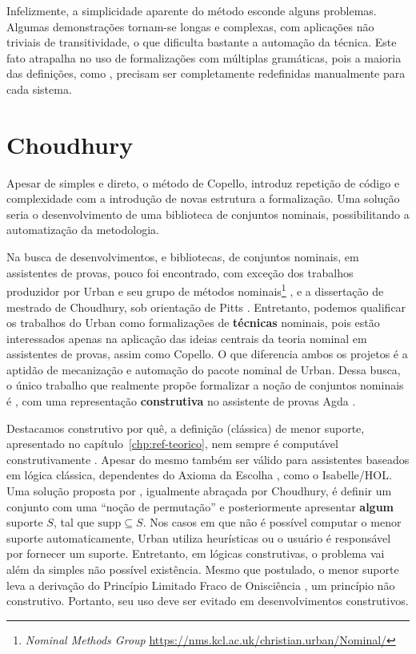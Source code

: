 Infelizmente, a simplicidade aparente do método esconde alguns problemas. Algumas demonstrações tornam-se longas e complexas, com aplicações não triviais de transitividade, o que dificulta bastante a automação da técnica. Este fato atrapalha no uso de formalizações com múltiplas gramáticas, pois a maioria das definições, como , precisam ser completamente redefinidas manualmente para cada sistema.

\section{Choudhury}\label{sec:choudhury}
Apesar de simples e direto, o método de Copello, introduz repetição de código e complexidade com a introdução de novas estrutura a formalização. Uma solução seria o desenvolvimento de uma biblioteca de conjuntos nominais, possibilitando a automatização da metodologia.

Na busca de desenvolvimentos, e bibliotecas, de conjuntos nominais, em assistentes de provas, pouco foi encontrado, com exceção dos trabalhos produzidor por Urban e seu grupo de métodos nominais\footnote{\textit{Nominal Methods Group} \url{https://nms.kcl.ac.uk/christian.urban/Nominal/}} \cite{Urban2008,Urban2005,Urban2006,Huffman2010,Urban2011}, e a dissertação de mestrado de Choudhury, sob orientação de Pitts \cite{Choudhury2015}. Entretanto,
podemos qualificar os trabalhos do Urban como formalizações de \textbf{técnicas} nominais, pois estão interessados apenas na aplicação das ideias centrais da teoria nominal em assistentes de provas, assim como Copello. O que diferencia ambos os projetos é a aptidão de mecanização e automação do pacote nominal de Urban. Dessa busca, o único trabalho que realmente propõe formalizar a noção de conjuntos nominais é \cite{Choudhury2015}, com uma representação \textbf{construtiva} no assistente de provas Agda \cite{Bove2009}.

Destacamos construtivo por quê, a definição (clássica) de menor suporte, apresentado no capítulo~\ref{chp:ref-teorico}, nem sempre é computável construtivamente \cite{Swan2016,Swan2017}. Apesar do mesmo também ser válido para assistentes baseados em lógica clássica, dependentes do Axioma da Escolha \cite{Pitts2006}, como o Isabelle/HOL. Uma solução proposta por \cite{Urban2008}, igualmente abraçada por Choudhury, é definir um conjunto com uma ``noção de permutação'' e posteriormente apresentar \textbf{algum} suporte $S$, tal que $\text{supp} \subseteq S$. Nos casos em que não é possível computar o menor suporte automaticamente, Urban utiliza heurísticas ou o usuário é responsável por fornecer um suporte. Entretanto, em lógicas construtivas, o problema vai além da simples não possível existência. Mesmo que postulado, o menor suporte leva a derivação do Princípio Limitado Fraco de Onisciência \cite{Swan2017}, um princípio não construtivo. Portanto, seu uso deve ser evitado em desenvolvimentos construtivos. 


